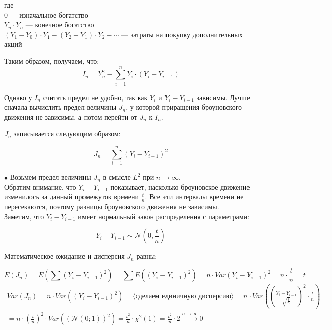 \documentclass[a4paper]{article}
\begin{document}
 \begin{flushleft}
 где\\
 0 --- изначальное богатство\\
 $Y_n \cdot Y_n$ --- конечное богатство\\
 $\left(Y_1-Y_0\right)\cdot Y_1-\left(Y_2-Y_1\right)\cdot Y_2-\cdots$ --- затраты на покупку дополнительных акций
 \end{flushleft}

 Таким образом, получаем, что:
 \begin{equation}\label{eq:I_n}
 I_n=Y^{2}_{n}-\sum_{i=1}^{n}Y_i\cdot\left(Y_i-Y_{i-1}\right)
 \end{equation}

 Однако у $I_n$ считать предел не удобно, так как $Y_i$ и $Y_i-Y_{i-1}$ зависимы. Лучше сначала вычислить предел величины $J_n$, у которой приращения броуновского движения не зависимы, а потом перейти от $J_n$ к $I_n$.

 $J_n$ записывается следующим образом:

 \begin{equation}\label{eq:J_n}
   J_n=\sum_{i=1}^{n}\left(Y_i-Y_{i-1}\right)^2
   \end{equation}

 \newpage
 $\bullet$ Возьмем предел величины $J_n$ в смысле $L^2$ при $n \rightarrow \infty$.\\

 Обратим внимание, что $Y_i-Y_{i-1}$ показывает, насколько броуновское движение изменилось за данный промежуток времени $\frac{t}{n}$. Все эти интервалы времени не пересекаются, поэтому разницы броуновского движения не зависимы.\\

 Заметим, что $Y_i-Y_{i-1}$ имеет нормальный закон распределения с параметрами:

  $$Y_i-Y_{i-1}\sim \mathcal{N}\left(0,\frac{t}{n}\right)$$

 Математическое ожидание и дисперсия $J_n$ равны:

  $$E(J_n)=E\left(\sum\left(Y_i-Y_{i-1}\right)^2\right)=\sum E\left(\left(Y_i-Y_{i-1}\right)^2\right)=n\cdot Var\left(Y_i-Y_{i-1}\right)^2=n\cdot\frac{t}{n}=t$$
  \begin{multline*}
  Var(J_n)=n\cdot Var\left(\left(Y_i-Y_{i-1}\right)^2\right)=\langle\text{сделаем единичную дисперсию}\rangle=n\cdot Var\left(\left(\frac{Y_i-Y_{i-1}}{\sqrt{\frac{t}{n}}}\right)^2\cdot\frac{t}{n}\right)=\\
  =n\cdot\left(\frac{t}{n}\right)^2\cdot Var\left(\left(\mathcal{N}\left(0;1\right)\right)^2\right)=\frac{t^2}{n}\cdot\chi^2(1)=\frac{t^2}{n}\cdot2\xrightarrow{n\rightarrow\infty}0
  \end{multline*}
\end{document}
